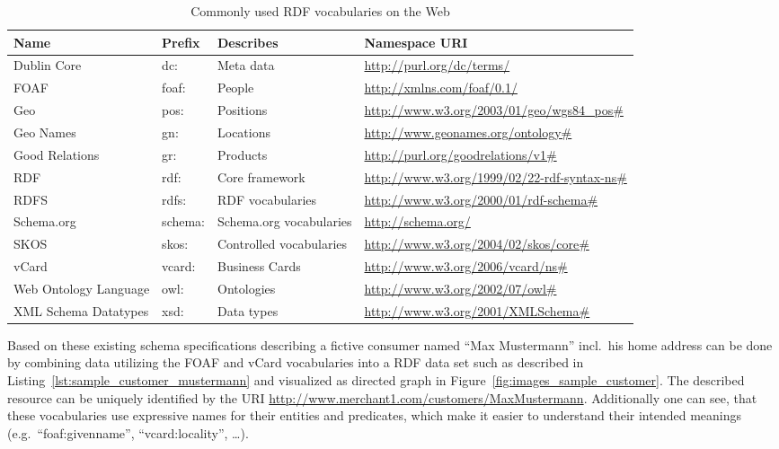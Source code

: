 \begin{table}[H]
\centering
\begin{tabular}{p{3cm}llp{4.5cm}}
\hline
\textbf{Name} & \textbf{Prefix} & \textbf{Describes} & \textbf{Namespace URI} \\
\hline
Dublin Core & dc: & Meta data & \url{http://purl.org/dc/terms/} \\
\hline
FOAF & foaf: & People & \url{http://xmlns.com/foaf/0.1/} \\
\hline
Geo & pos: & Positions & \url{http://www.w3.org/2003/01/geo/wgs84\_pos\#} \\
\hline
Geo Names & gn: & Locations & \url{http://www.geonames.org/ontology\#} \\
\hline
Good Relations & gr: & Products & \url{http://purl.org/goodrelations/v1\#} \\
\hline
RDF & rdf: & Core framework & \url{http://www.w3.org/1999/02/22-rdf-syntax-ns\#} \\
\hline
RDFS & rdfs: & RDF vocabularies & \url{http://www.w3.org/2000/01/rdf-schema\#} \\
\hline
Schema.org & schema: & Schema.org vocabularies & \url{http://schema.org/} \\
\hline
SKOS & skos: & Controlled vocabularies & \url{http://www.w3.org/2004/02/skos/core\#} \\
\hline
vCard & vcard: & Business Cards & \url{http://www.w3.org/2006/vcard/ns\#} \\
\hline
Web Ontology Language & owl: & Ontologies & \url{http://www.w3.org/2002/07/owl\#} \\
\hline
XML Schema Datatypes & xsd: & Data types & \url{http://www.w3.org/2001/XMLSchema\#} \\
\hline
\end{tabular}
\caption[Commonly used \gls{RDF} vocabularies on the Web]{Commonly used \gls{RDF} vocabularies on the Web \citep[pg. 41]{wood2014linked}}
\label{tab:used_vocab_rdf}
\end{table}

Based on these existing schema specifications describing a fictive consumer named ``Max Mustermann'' incl.\ his home address can be done by combining data utilizing the \gls{FOAF} and \gls{vCard} vocabularies into a \gls{RDF} data set such as described in Listing~\ref{lst:sample_customer_mustermann} and visualized as directed graph in Figure~\ref{fig:images_sample_customer}. The described resource can be uniquely identified by the \gls{URI} \url{http://www.merchant1.com/customers/MaxMustermann}. Additionally one can see, that these vocabularies use expressive names for their entities and predicates, which make it easier to understand their intended meanings (e.g.\ ``foaf:givenname'', ``vcard:locality'', \ldots).  \@

